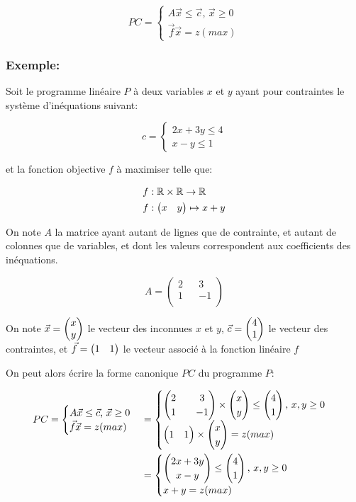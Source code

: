\documentclass[a4paper, 11pt]{article}
\begin{document}
\[ PC=
  \begin{cases}
    A\vec{x} \le \vec{c}\text{, } \vec{x} \ge 0 \\
    \vec{f}\vec{x} = z (max)
  \end{cases}
\]

\subsubsection{Exemple:}
Soit le programme linéaire $P$ à deux variables $x$ et $y$ ayant pour contraintes le système d'inéquations suivant:

\[ c=
  \begin{cases}
    2x + 3y \le 4 \\
    x - y \le 1
  \end{cases}
\]

et la fonction objective $f$ à maximiser telle que:

\[
  \begin{aligned}
    & f : \mathbb{R} \times \mathbb{R} \to \mathbb{R} \\
    & f : \begin{pmatrix} x & y \end{pmatrix} \mapsto x + y
  \end{aligned}
\]

On note $A$ la matrice ayant autant de lignes que de contrainte, et autant de colonnes que de variables, et dont les valeurs correspondent aux coefficients des inéquations.

\[ A=
  \begin{pmatrix}
    2 && 3 \\
    1 && -1 \\
  \end{pmatrix}
\]

On note $\vec{x} = \begin{pmatrix} x \\ y \end{pmatrix}$ le vecteur des inconnues $x$ et $y$, $\vec{c} = \begin{pmatrix} 4 \\ 1 \end{pmatrix}$ le vecteur des contraintes, et $\vec{f} = \begin{pmatrix} 1 & 1 \end{pmatrix}$ le vecteur associé à la fonction linéaire $f$

On peut alors écrire la forme canonique $PC$ du programme $P$:

\[
  \begin{aligned}
    PC =
    \begin{cases}
      A\vec{x} \le \vec{c}\text{, } \vec{x} \ge 0 \\
      \vec{f}\vec{x} = z (max)
    \end{cases}
    & =
    \begin{cases}
      \begin{pmatrix}
        2 &&  3 \\
        1 && -1 \\
      \end{pmatrix}
      \times \begin{pmatrix} x \\ y \end{pmatrix} \le \begin{pmatrix} 4 \\ 1 \end{pmatrix}\text{, }x, y \ge 0\\
      
      \begin{pmatrix} 1 & 1 \end{pmatrix} \times \begin{pmatrix} x \\ y \end{pmatrix} = z (max)
    \end{cases} \\
    & =
    \begin{cases}
      \begin{pmatrix} 2x + 3y \\ x - y \end{pmatrix} \le \begin{pmatrix} 4 \\ 1 \end{pmatrix}\text{, }x, y \ge 0\\
      
      x + y = z (max)
    \end{cases}
  \end{aligned}
\]
\end{document}
